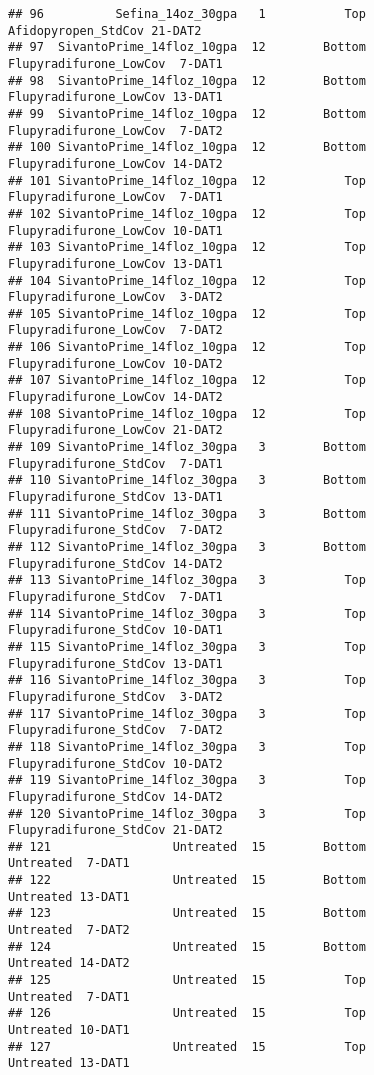 \documentclass[
]{article}
\begin{document}
\begin{verbatim}
## 96          Sefina_14oz_30gpa   1           Top    Afidopyropen_StdCov 21-DAT2
## 97  SivantoPrime_14floz_10gpa  12        Bottom Flupyradifurone_LowCov  7-DAT1
## 98  SivantoPrime_14floz_10gpa  12        Bottom Flupyradifurone_LowCov 13-DAT1
## 99  SivantoPrime_14floz_10gpa  12        Bottom Flupyradifurone_LowCov  7-DAT2
## 100 SivantoPrime_14floz_10gpa  12        Bottom Flupyradifurone_LowCov 14-DAT2
## 101 SivantoPrime_14floz_10gpa  12           Top Flupyradifurone_LowCov  7-DAT1
## 102 SivantoPrime_14floz_10gpa  12           Top Flupyradifurone_LowCov 10-DAT1
## 103 SivantoPrime_14floz_10gpa  12           Top Flupyradifurone_LowCov 13-DAT1
## 104 SivantoPrime_14floz_10gpa  12           Top Flupyradifurone_LowCov  3-DAT2
## 105 SivantoPrime_14floz_10gpa  12           Top Flupyradifurone_LowCov  7-DAT2
## 106 SivantoPrime_14floz_10gpa  12           Top Flupyradifurone_LowCov 10-DAT2
## 107 SivantoPrime_14floz_10gpa  12           Top Flupyradifurone_LowCov 14-DAT2
## 108 SivantoPrime_14floz_10gpa  12           Top Flupyradifurone_LowCov 21-DAT2
## 109 SivantoPrime_14floz_30gpa   3        Bottom Flupyradifurone_StdCov  7-DAT1
## 110 SivantoPrime_14floz_30gpa   3        Bottom Flupyradifurone_StdCov 13-DAT1
## 111 SivantoPrime_14floz_30gpa   3        Bottom Flupyradifurone_StdCov  7-DAT2
## 112 SivantoPrime_14floz_30gpa   3        Bottom Flupyradifurone_StdCov 14-DAT2
## 113 SivantoPrime_14floz_30gpa   3           Top Flupyradifurone_StdCov  7-DAT1
## 114 SivantoPrime_14floz_30gpa   3           Top Flupyradifurone_StdCov 10-DAT1
## 115 SivantoPrime_14floz_30gpa   3           Top Flupyradifurone_StdCov 13-DAT1
## 116 SivantoPrime_14floz_30gpa   3           Top Flupyradifurone_StdCov  3-DAT2
## 117 SivantoPrime_14floz_30gpa   3           Top Flupyradifurone_StdCov  7-DAT2
## 118 SivantoPrime_14floz_30gpa   3           Top Flupyradifurone_StdCov 10-DAT2
## 119 SivantoPrime_14floz_30gpa   3           Top Flupyradifurone_StdCov 14-DAT2
## 120 SivantoPrime_14floz_30gpa   3           Top Flupyradifurone_StdCov 21-DAT2
## 121                 Untreated  15        Bottom              Untreated  7-DAT1
## 122                 Untreated  15        Bottom              Untreated 13-DAT1
## 123                 Untreated  15        Bottom              Untreated  7-DAT2
## 124                 Untreated  15        Bottom              Untreated 14-DAT2
## 125                 Untreated  15           Top              Untreated  7-DAT1
## 126                 Untreated  15           Top              Untreated 10-DAT1
## 127                 Untreated  15           Top              Untreated 13-DAT1

\end{verbatim}
\end{document}
